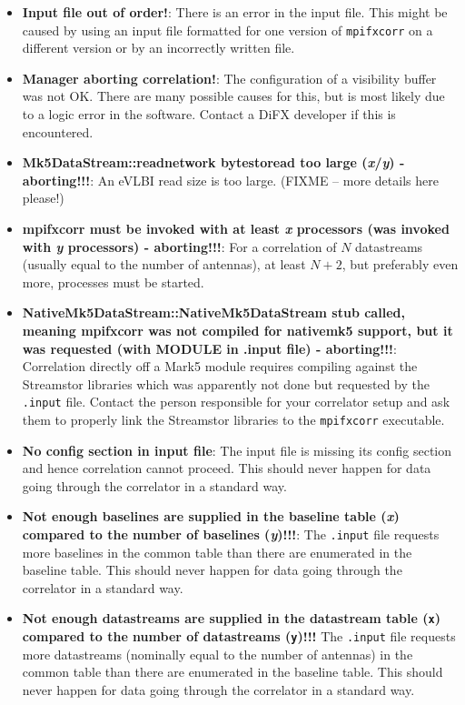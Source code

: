 \begin{itemize}
\item {\bf Input file out of order!}:
There is an error in the input file.
This might be caused by using an input file formatted for one version of {\tt mpifxcorr} on a different version or by an incorrectly written file.

\item {\bf Manager aborting correlation!}:
The configuration of a visibility buffer was not OK.
There are many possible causes for this, but is most likely due to a logic error in the software.
Contact a DiFX developer if this is encountered.

\item {\bf Mk5DataStream::readnetwork bytestoread too large ({\it x}/{\it y}) - aborting!!!}:
An eVLBI read size is too large. (FIXME -- more details here please!)

\item {\bf mpifxcorr must be invoked with at least {\it x} processors (was invoked with {\it y} processors) - aborting!!!}:
For a correlation of $N$ datastreams (usually equal to the number of antennas), at least $N+2$, but preferably even more, processes must be started.

\item {\bf NativeMk5DataStream::NativeMk5DataStream stub called, meaning mpifxcorr was not compiled for nativemk5 support, but it was requested (with MODULE in .input file) - aborting!!!}:
Correlation directly off a Mark5 module requires compiling against the Streamstor libraries which was apparently not done but requested by the {\tt .input} file.
Contact the person responsible for your correlator setup and ask them to properly link the Streamstor libraries to the {\tt mpifxcorr} executable.

\item {\bf No config section in input file}:
The input file is missing its config section and hence correlation cannot proceed.
This should never happen for data going through the correlator in a standard way.

\item {\bf Not enough baselines are supplied in the baseline table ({\it x}) compared to the number of baselines ({\it y})!!!}:
The {\tt .input} file requests more baselines in the common table than there are enumerated in the baseline table.
This should never happen for data going through the correlator in a standard way.

\item {\bf Not enough datastreams are supplied in the datastream table ({\tt x}) compared to the number of datastreams ({\tt y})!!!}
The {\tt .input} file requests more datastreams (nominally equal to the number of antennas) in the common table than there are enumerated in the baseline table.
This should never happen for data going through the correlator in a standard way.


\end{itemize}
